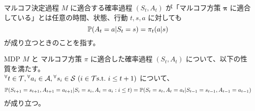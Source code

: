 \begin{definition}
    マルコフ決定過程 $M$ に適合する確率過程 $(S_t, A_t)$ が「マルコフ方策 $\bm{\pi}$ に適合している」とは任意の時間、状態、行動 $t, s, a$ に対しても
    \[
        {\mathbb{P}}(A_t = a | S_t = s) = \pi_t(a | s)
    \]
    が成り立つときのことを指す。%
\end{definition}

\begin{proposition}
    MDP $M$ と マルコフ方策 $\pi$ に適合した確率過程 $(S_t, A_t)$ について、以下の性質を満たす。 \\
    ${{}^{\forall}} t \in {\cal T}, {{}^{\forall}} a_i \in {\cal A}, {{}^{\forall}} s_i \in {\cal S} \ (i \in {\cal T} \text{s.t.\ } i \leq t + 1)$ について、
    \begin{align}
        {\mathbb{P}}(S_{t + 1} = s_{t + 1}, A_{t + 1} = a_{t + 1} | S_{i} = s_{i}, A_{i} = a_{i} : i \leq t) = {\mathbb{P}}(S_t = s_t, A_t = a_t | S_{t-1} = s_{t-1}, A_{t-1} = a_{t-1})
    \end{align}
    が成り立つ。
\end{proposition}